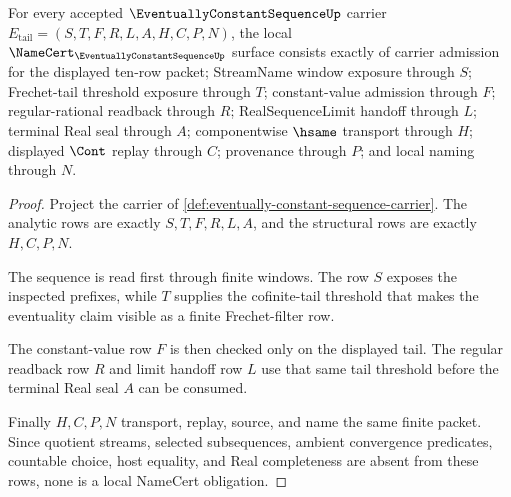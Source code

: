 \begin{theorem}
\label{thm:eventually-constant-sequence-namecert-obligations}
For every accepted $\EventuallyConstantSequenceUp$ carrier $E_{\mathrm{tail}}=(S,T,F,R,L,A,H,C,P,N)$, the local $\NameCert_{\EventuallyConstantSequenceUp}$ surface consists exactly of carrier admission for the displayed ten-row packet; StreamName window exposure through $S$; Frechet-tail threshold exposure through $T$; constant-value admission through $F$; regular-rational readback through $R$; RealSequenceLimit handoff through $L$; terminal Real seal through $A$; componentwise $\hsame$ transport through $H$; displayed $\Cont$ replay through $C$; provenance through $P$; and local naming through $N$.
\end{theorem}
\begin{proof}
Project the carrier of \autoref{def:eventually-constant-sequence-carrier}. The analytic rows are exactly $S,T,F,R,L,A$, and the structural rows are exactly $H,C,P,N$.

The sequence is read first through finite windows. The row $S$ exposes the inspected prefixes, while $T$ supplies the cofinite-tail threshold that makes the eventuality claim visible as a finite Frechet-filter row.

The constant-value row $F$ is then checked only on the displayed tail. The regular readback row $R$ and limit handoff row $L$ use that same tail threshold before the terminal Real seal $A$ can be consumed.

Finally $H,C,P,N$ transport, replay, source, and name the same finite packet. Since quotient streams, selected subsequences, ambient convergence predicates, countable choice, host equality, and Real completeness are absent from these rows, none is a local NameCert obligation.
\end{proof}

